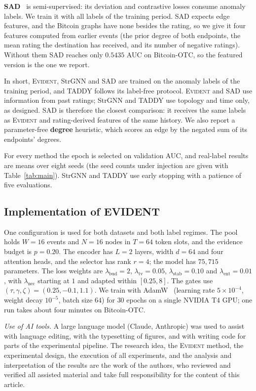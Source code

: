 \documentclass[pdflatex,sn-basic]{sn-jnl}
\newcommand{\evident}{\textsc{Evident}}
\theoremstyle{definition}
\theoremstyle{plain}
\begin{document}
\textbf{SAD}~\cite{sad} is semi-supervised: its deviation and contrastive
losses consume anomaly labels. We train it with all labels of the training
period. SAD expects edge features, and the Bitcoin graphs have none besides
the rating, so we give it four features computed from earlier events (the
prior degree of both endpoints, the mean rating the destination has received,
and its number of negative ratings). Without them SAD reaches only $0.5435$
AUC on Bitcoin-OTC, so the featured version is the one we report.

In short, \evident{}, StrGNN and SAD are trained on the anomaly labels of the
training period, and TADDY follows its label-free protocol. \evident{} and SAD
use information from past ratings; StrGNN and TADDY use topology and time only,
as designed. SAD is therefore the closest comparison: it receives the same labels as
\evident{} and rating-derived features of the same history. We also
report a parameter-free \textbf{degree} heuristic, which scores an edge by the
negated sum of its endpoints' degrees.

For every method the epoch is selected on validation AUC, and real-label
results are means over eight seeds (the seed counts under injection are given
with Table~\ref{tab:main}). StrGNN and TADDY use early stopping with a patience of
five evaluations.

\subsection{Implementation of EVIDENT}
One configuration is used for both datasets and both label regimes. The pool
holds $W=16$ events and $N=16$ nodes in $T=64$ token slots, and the evidence
budget is $p=0.20$. The encoder has $L=2$ layers, width $d=64$ and four
attention heads, and the selector has rank $r=4$; the model has $75{,}715$
parameters. The loss weights are $\lambda_{\text{bud}}=2$,
$\lambda_{\text{tv}}=0.05$, $\lambda_{\text{stab}}=0.10$ and
$\lambda_{\text{ent}}=0.01$, with $\lambda_{\text{nec}}$ starting at $1$ and
adapted within $[0.25,8]$. The gates use $(\tau,\gamma,\zeta)=(0.25,-0.1,1.1)$.
We train with AdamW~\cite{adamw} (learning rate $5\times10^{-4}$, weight decay
$10^{-5}$, batch size $64$) for $30$ epochs on a single NVIDIA T4 GPU; one run
takes about four minutes on Bitcoin-OTC.

\emph{Use of AI tools.} A large language model (Claude, Anthropic) was used to
assist with language editing, with the typesetting of figures, and with
writing code for parts of the experimental pipeline. The research idea, the
\evident{} method, the experimental design, the execution of all experiments,
and the analysis and interpretation of the results are the work of the
authors, who reviewed and verified all assisted material and take full
responsibility for the content of this article.
\end{document}

